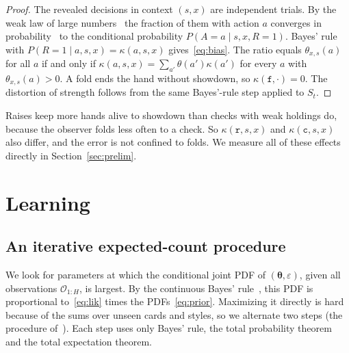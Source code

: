 \documentclass[11pt,a4paper]{article}
\newcommand{\Sb}{S}           %
\newcommand{\A}{A}            %
\newcommand{\R}{R}            %
\newcommand{\1}{\mathbf{1}}
\newcommand{\BT}[1]{\cite[§#1]{bertsekas2000}}
\begin{document}
\begin{proof}
The revealed decisions in context $(s,x)$ are independent trials. By the weak
law of large numbers~\BT{7.2} the fraction of them with action $a$ converges in
probability~\BT{7.3} to the conditional probability $P(\A=a\mid s,x,\R=1)$.
Bayes' rule~\BT{1.4} with $P(\R=1\mid a,s,x)=\kappa(a,s,x)$
gives~\eqref{eq:bias}. The ratio equals $\theta_{x,s}(a)$ for all $a$ if and only
if $\kappa(a,s,x)=\sum_{a'}\theta(a')\kappa(a')$ for every $a$ with
$\theta_{x,s}(a)>0$. A fold ends the hand without showdown, so
$\kappa(\mathtt{f},\cdot)=0$. The distortion of strength follows from the same
Bayes'-rule step applied to $\Sb_t$.
\end{proof}

Raises keep more hands alive to showdown than checks with weak holdings do,
because the observer folds less often to a check. So $\kappa(\mathtt{r},s,x)$ and
$\kappa(\mathtt{c},s,x)$ also differ, and the error is not confined to folds. We
measure all of these effects directly in Section~\ref{sec:prelim}.

\section{Learning}\label{sec:learning}

\subsection{An iterative expected-count procedure}
We look for parameters at which the conditional joint PDF of
$(\bm\theta,\varepsilon)$, given all observations $\mathcal{O}_{1:H}$, is largest.
By the continuous Bayes' rule~\BT{3.5}, this PDF is proportional
to~\eqref{eq:lik} times the PDFs~\eqref{eq:prior}. Maximizing it directly is
hard because of the sums over unseen cards and styles, so we alternate two
steps (the procedure of~\cite{dempster1977}). Each step uses only Bayes' rule,
the total probability theorem and the total expectation theorem.
\end{document}

